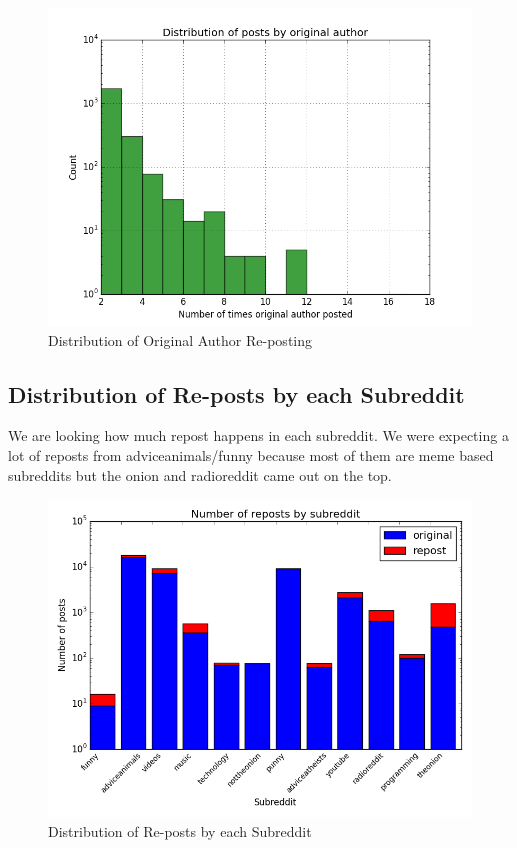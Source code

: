 \documentclass{article} %
\begin{document}
\begin{figure}[h]
\begin{center}
\includegraphics[width=5in]{original_author.png}
\caption{Distribution of Original Author Re-posting}
\end{center}
\end{figure}


\subsection{Distribution of Re-posts by each Subreddit}

We are looking how much repost happens in each subreddit. We were expecting a lot of reposts from adviceanimals/funny because most of them are meme based subreddits but the onion and radioreddit came out on the top. 

\begin{figure}[h]
\begin{center}
\includegraphics[width=5in]{reposts.png}
\caption{Distribution of Re-posts by each Subreddit}
\end{center}
\end{figure}
\end{document}
